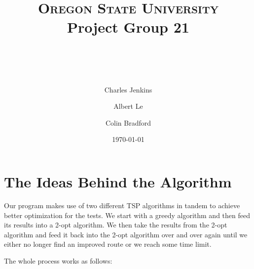 \documentclass[paper=a4, fontsize=11pt]{scrartcl} %
\title{ 
    \normalfont \normalsize 
    \textsc{Oregon State University} \\ [25pt]
    \large Project Group 21
    \horrule{0.5pt} \\[0.4cm] %
    \huge \hwtitle \\ %
    \horrule{2pt} \\[0.5cm] %
}
\author{
	Charles Jenkins
	\and
    Albert Le
    \and
    Colin Bradford    
} %
\date{\normalsize\today} %
\numberwithin{equation}{section} %
\numberwithin{figure}{section} %
\numberwithin{table}{section} %
\begin{document}
\maketitle %

\section{The Ideas Behind the Algorithm}
Our program makes use of two different TSP algorithms in tandem to achieve better optimization for the tests. We start with a greedy algorithm and then feed its results into a 2-opt algorithm. We then take the results from the 2-opt algorithm and feed it back into the 2-opt algorithm over and over again until we either no longer find an improved route or we reach some time limit.\newline

The whole process works as follows:
\end{document}
